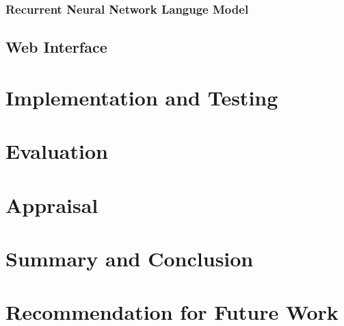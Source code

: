 \documentclass[12pt,a4paper]{report}
\begin{document}
\subsubsection{Recurrent Neural Network Languge Model}



\subsection{Web Interface}
\section{Implementation and Testing}
\section{Evaluation}
\section{Appraisal}
\section{Summary and Conclusion}
\section{Recommendation for Future Work}
\end{document}
